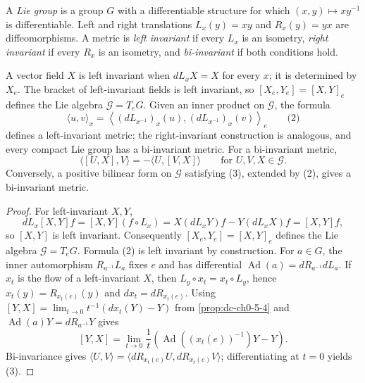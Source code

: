 \begin{example}
  \label{ex:dc-ch1-2-6}
  \notready
  A \emph{Lie group} is a group $G$ with a differentiable structure for which
  $(x,y)\mapsto xy^{-1}$ is differentiable. Left and right translations
  $L_x(y)=xy$ and $R_x(y)=yx$ are diffeomorphisms. A metric is \emph{left invariant}
  if every $L_x$ is an isometry, \emph{right invariant} if every $R_x$ is an
  isometry, and \emph{bi-invariant} if both conditions hold.

  A vector field $X$ is left invariant when $dL_xX=X$ for every $x$; it is determined
  by $X_e$. The bracket of left-invariant fields is left invariant, so
  $[X_e,Y_e]=[X,Y]_e$ defines the Lie algebra $\mathcal{G}=T_eG$. Given an inner
  product on $\mathcal{G}$, the formula
  $$
  \langle u,v\rangle_x=
  \left\langle(dL_{x^{-1}})_x(u),(dL_{x^{-1}})_x(v)\right\rangle_e
  \qquad\text{(2)}
  $$
  defines a left-invariant metric; the right-invariant construction is analogous,
  and every compact Lie group has a bi-invariant metric. For a bi-invariant metric,
  $$
  \langle[U,X],V\rangle=-\langle U,[V,X]\rangle
  \qquad\text{for }U,V,X\in\mathcal{G}.\tag{3}
  $$
  Conversely, a positive bilinear form on $\mathcal{G}$ satisfying (3), extended
  by (2), gives a bi-invariant metric.
\end{example}
\begin{proof}
  \sketch
  For left-invariant $X,Y$,
  $$
  dL_x[X,Y]f=[X,Y](f\circ L_x)=X(dL_xY)f-Y(dL_xX)f=[X,Y]f,
  $$
  so $[X,Y]$ is left invariant. Consequently $[X_e,Y_e]=[X,Y]_e$ defines the Lie
  algebra $\mathcal{G}=T_eG$. Formula (2) is left invariant by construction.
  For $a\in G$, the inner automorphism $R_{a^{-1}}L_a$ fixes $e$ and has
  differential $\operatorname{Ad}(a)=dR_{a^{-1}}dL_a$. If $x_t$ is the flow of a
  left-invariant $X$, then $L_y\circ x_t=x_t\circ L_y$, hence
  $x_t(y)=R_{x_t(e)}(y)$ and $dx_t=dR_{x_t(e)}$. Using
  $[Y,X]=\lim_{t\to0}t^{-1}(dx_t(Y)-Y)$ from
  \cref{prop:dc-ch0-5-4} and
  $\operatorname{Ad}(a)Y=dR_{a^{-1}}Y$ gives
  $$
  [Y,X]=\lim_{t\to0}\frac{1}{t}
  \left(\operatorname{Ad}((x_t(e))^{-1})Y-Y\right).
  $$
  Bi-invariance gives
  $\langle U,V\rangle=\langle dR_{x_t(e)}U,dR_{x_t(e)}V\rangle$; differentiating at
  $t=0$ yields (3).
\end{proof}

